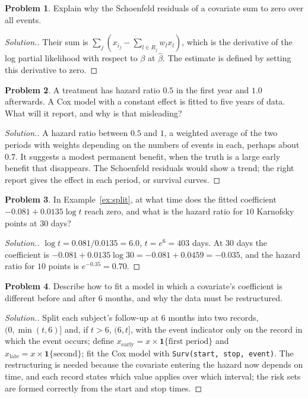 \documentclass[11pt,a4paper]{article}
\numberwithin{equation}{section}
\theoremstyle{definition}
\newtheorem{problemx}{Problem}[subsection]
\newenvironment{problem}{\begin{problemx}}{\end{problemx}}
\newenvironment{solution}
  {\renewcommand{\qedsymbol}{}\begin{proof}[\textit{Solution}.]}
  {\end{proof}}
\begin{document}
\begin{problem}
Explain why the Schoenfeld residuals of a covariate sum to zero over all events.
\end{problem}

\begin{solution}
Their sum is $\sum_j(x_{i_j} - \sum_{l \in R_j}w_lx_l)$, which is the derivative of the log partial likelihood with respect to $\beta$ at $\hat\beta$. The estimate is defined by setting this derivative to zero.
\end{solution}

\begin{problem}
A treatment has hazard ratio $0.5$ in the first year and $1.0$ afterwards. A Cox model with a constant effect is fitted to five years of data. What will it report, and why is that misleading?
\end{problem}

\begin{solution}
A hazard ratio between $0.5$ and $1$, a weighted average of the two periods with weights depending on the numbers of events in each, perhaps about $0.7$. It suggests a modest permanent benefit, when the truth is a large early benefit that disappears. The Schoenfeld residuals would show a trend; the right report gives the effect in each period, or survival curves.
\end{solution}

\begin{problem}
In Example~\ref{ex:split}, at what time does the fitted coefficient $-0.081 + 0.0135\log t$ reach zero, and what is the hazard ratio for $10$ Karnofsky points at $30$ days?
\end{problem}

\begin{solution}
$\log t = 0.081/0.0135 = 6.0$, $t = e^6 = 403$ days. At $30$ days the coefficient is $-0.081 + 0.0135\log 30 = -0.081 + 0.0459 = -0.035$, and the hazard ratio for $10$ points is $e^{-0.35} = 0.70$.
\end{solution}

\begin{problem}
Describe how to fit a model in which a covariate's coefficient is different before and after $6$ months, and why the data must be restructured.
\end{problem}

\begin{solution}
Split each subject's follow-up at $6$ months into two records, $(0, \min(t, 6)]$ and, if $t > 6$, $(6, t]$, with the event indicator only on the record in which the event occurs; define $x_{\text{early}} = x \times \mathbf 1\{\text{first period}\}$ and $x_{\text{late}} = x \times \mathbf 1\{\text{second}\}$; fit the Cox model with
\texttt{Surv(start, stop, event)}. The restructuring is needed because the covariate entering the hazard now depends on time, and each record states which value applies over which interval; the risk sets are formed correctly from the start and stop times.
\end{solution}
\end{document}
